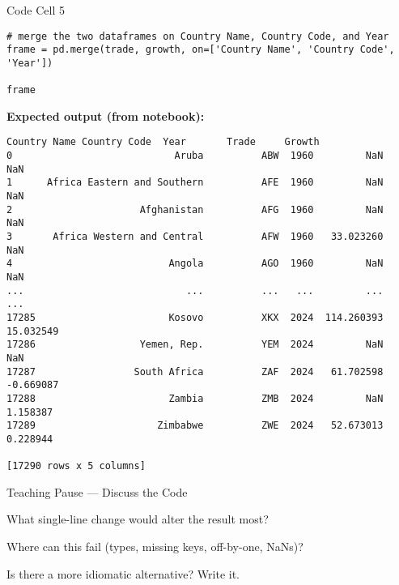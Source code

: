 \documentclass[notes,11pt, aspectratio=169, xcolor=table]{beamer}
\newenvironment{wideitemize}{\itemize\addtolength{\itemsep}{10pt}}{\enditemize}
\begin{document}
\begin{frame}[fragile]{Code Cell 5}
\begin{verbatim}
# merge the two dataframes on Country Name, Country Code, and Year
frame = pd.merge(trade, growth, on=['Country Name', 'Country Code', 'Year'])

frame
\end{verbatim}
\vspace{0.5ex}
\textbf{Expected output (from notebook):}
\begin{verbatim}
Country Name Country Code  Year       Trade     Growth
0                            Aruba          ABW  1960         NaN        NaN
1      Africa Eastern and Southern          AFE  1960         NaN        NaN
2                      Afghanistan          AFG  1960         NaN        NaN
3       Africa Western and Central          AFW  1960   33.023260        NaN
4                           Angola          AGO  1960         NaN        NaN
...                            ...          ...   ...         ...        ...
17285                       Kosovo          XKX  2024  114.260393  15.032549
17286                  Yemen, Rep.          YEM  2024         NaN        NaN
17287                 South Africa          ZAF  2024   61.702598  -0.669087
17288                       Zambia          ZMB  2024         NaN   1.158387
17289                     Zimbabwe          ZWE  2024   52.673013   0.228944

[17290 rows x 5 columns]
\end{verbatim}
\end{frame}

\begin{frame}{Teaching Pause — Discuss the Code}
\begin{wideitemize}
\item What single-line change would alter the result most?
\item Where can this fail (types, missing keys, off-by-one, NaNs)?
\item Is there a more idiomatic alternative? Write it.
\end{wideitemize}
\end{frame}
\end{document}
